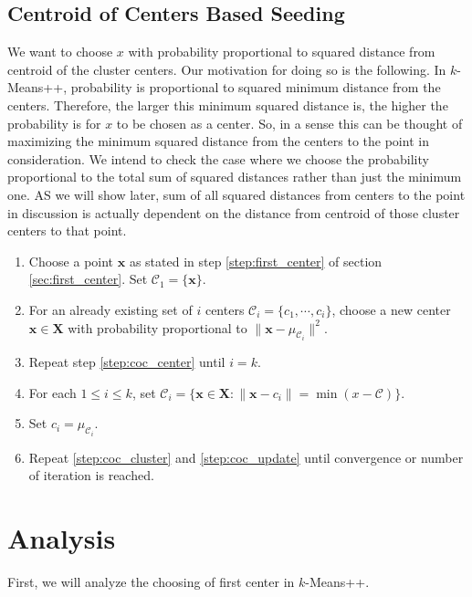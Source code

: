 \documentclass[twoside, 11pt]{article}
\newcommand{\x}{\mathbf{x}}
\newcommand{\X}{\mathbf{X}}
\newcommand{\C}{\mathcal{C}}
\begin{document}
	\subsection{Centroid of Centers Based Seeding}
	We want to choose $x$ with probability proportional to squared distance from centroid of the cluster centers. Our motivation for doing so is the following. In $k$-Means++, probability is proportional to squared minimum distance from the centers. Therefore, the larger this minimum squared distance is, the higher the probability is for $x$ to be chosen as a center. So, in a sense this can be thought of maximizing the minimum squared distance from the centers to the point in consideration. We intend to check the case where we choose the probability proportional to the total sum of squared distances rather than just the minimum one. AS we will show later, sum of all squared distances from centers to the point in discussion is actually dependent on the distance from centroid of those cluster centers to that point.
		\begin{enumerate}[i]
			\item Choose a point $\x$ as stated in step \eqref{step:first_center} of section \eqref{sec:first_center}. Set $\C_1=\{\x\}$.
			\item For an already existing set of $i$ centers $\mathcal{C}_i=\{c_1,\cdots,c_i\}$, choose a new center $\x\in\X$ with probability proportional to $\|\x-\mu_{\C_i}\|^2$.\label{step:coc_center}
			\item Repeat step \eqref{step:coc_center} until $i=k$.
			\item For each $1\leq i\leq k$, set $\C_i=\{\x\in\X:\|\x-c_i\|=\min(x-\C)\}$.\label{step:coc_cluster}
			\item Set $c_i=\mu_{\C_i}$.\label{step:coc_update}
			\item Repeat \eqref{step:coc_cluster} and \eqref{step:coc_update} until convergence or number of iteration is reached.
		\end{enumerate}
	\section{Analysis}
	First, we will analyze the choosing of first center in $k$-Means++. 
\end{document}
